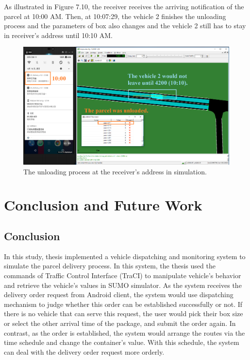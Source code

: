 \documentclass[12pt]{ksthesis}
\begin{document}
\begin{thesis}
{\begin{figure}[H]
\label{Fig:Receiver_request}
\end{figure}

As illustrated in Figure 7.10, the receiver receives the arriving notification of the parcel at 10:00 AM. Then, at 10:07:29, the vehicle 2 finishes the unloading process and the parameters of box also changes and the vehicle 2 still has to stay in receiver’s address until 10:10 AM.

\begin{figure}[H]
\centering
\includegraphics[width=1.12\textwidth]{./Thesis_figures/F7-10_unloadingProcess.PNG}
\caption{\large The unloading process at the receiver’s address in simulation.}
\vspace{0.5cm}
\label{Fig:unloading_request}
\end{figure}













\chapter{Conclusion and Future Work} \label{Chap:Conclusion}

\section{Conclusion}
In this study, thesis implemented a vehicle dispatching and monitoring system to simulate the parcel delivery process. In this system, the thesis used the commands of Traffic Control Interface (TraCI) to manipulate vehicle’s behavior and retrieve the vehicle’s values in SUMO simulator. As the system receives the delivery order request from Android client, the system would use dispatching mechanism to judge whether this order can be established successfully or not. If there is no vehicle that can serve this request, the user would pick their box size or select the other arrival time of the package, and submit the order again. In contrast, as the order is established, the system would arrange the routes via the time schedule and change the container’s value. With this schedule, the system can deal with the delivery order request more orderly. 

}
\end{thesis}
\end{document}
